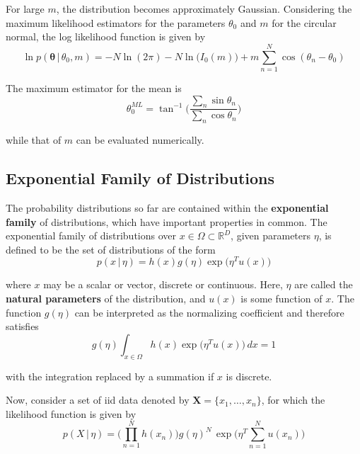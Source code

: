 \documentclass{article}
\begin{document}
    For large $m$, the distribution becomes approximately Gaussian. Considering the maximum likelihood estimators for the parameters $\theta_0$ and $m$ for the circular normal, the log likelihood function is given by
    \begin{equation}
      \ln p(\mathbf{\theta}\,|\, \theta_0, m) = -N \ln(2\pi) - N \ln \big( I_0(m)\big) + m \sum_{n=1}^N \cos(\theta_n - \theta_0)
    \end{equation}

    The maximum estimator for the mean is
    \begin{equation}
      \theta_{0}^{ML} = \tan^{-1} \bigg( \frac{\sum_n \sin{\theta_n}}{\sum_n \cos{\theta_n}} \bigg)
    \end{equation}

    while that of $m$ can be evaluated numerically.

  \subsection{Exponential Family of Distributions}

    The probability distributions so far are contained within the \textbf{exponential family} of distributions, which have important properties in common. The exponential family of distributions over $x \in \Omega \subset \mathbb{R}^D$, given parameters $\eta$, is defined to be the set of distributions of the form
    \begin{equation}
      p(x\,|\,\eta) = h(x) g(\eta) \exp\big(\eta^T u(x)\big)
    \end{equation}

    where $x$ may be a scalar or vector, discrete or continuous. Here, $\eta$ are called the \textbf{natural parameters} of the distribution, and $u(x)$ is some function of $x$. The function $g(\eta)$ can be interpreted as the normalizing coefficient and therefore satisfies
    \begin{equation}
      g(\eta) \int_{x \in \Omega} h(x) \exp\big(\eta^T u(x)\big) \, dx = 1
    \end{equation}

    with the integration replaced by a summation if $x$ is discrete.

    Now, consider a set of iid data denoted by $\mathbf{X} = \{x_1, \ldots, x_n\}$, for which the likelihood function is given by
    \begin{equation}
      p(X\,|\,\eta) = \bigg( \prod_{n=1}^N h(x_n) \bigg) g(\eta)^N\, \exp \bigg( \eta^T \sum_{n=1}^N u(x_n) \bigg)
    \end{equation}
\end{document}
